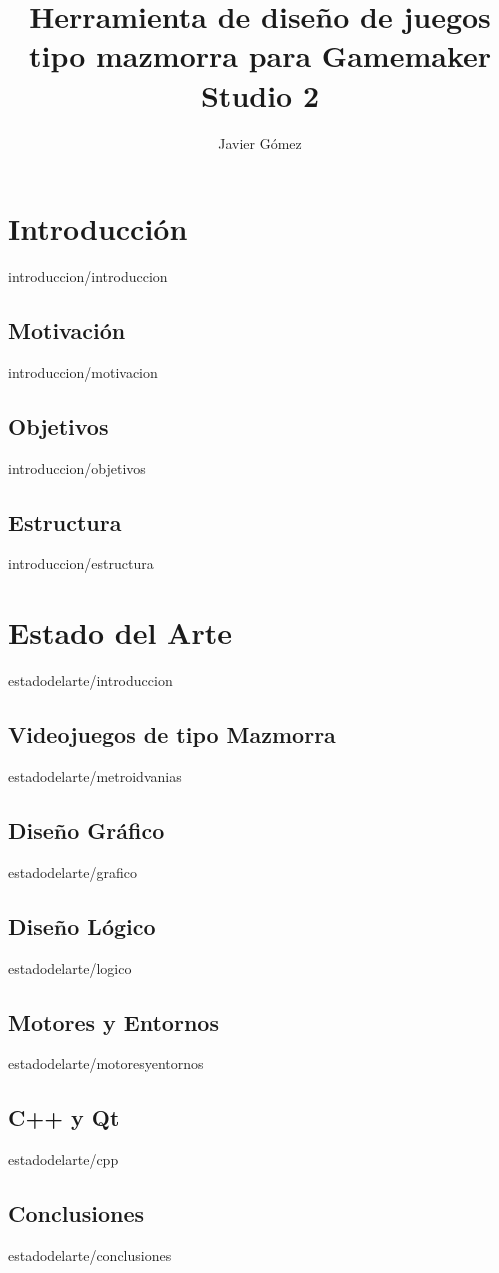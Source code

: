 \documentclass[epsbased,copyright,final,printable,covers,extendedindex,firstnumbered,tfg,gnuplot]{tfgtfmthesisuam}
\title{Herramienta de diseño de juegos tipo mazmorra para Gamemaker Studio 2}
\subtitle{}
\author{Javier Gómez}
\begin{document}
\chapter{Introducción\label{CAP:INTRODUCCION}}{introduccion/introduccion}
	\section{Motivación\label{SEC:MOTIVACION}}{introduccion/motivacion}
	\section{Objetivos\label{SEC:OBJETIVOS}}{introduccion/objetivos}
	\section{Estructura\label{SEC:ESTRUCTURA}}{introduccion/estructura}
	
\chapter{Estado del Arte\label{CAP:ESTADODELARTE}}{estadodelarte/introduccion}
	\section{Videojuegos de tipo Mazmorra\label{SEC:METROIDVANIAS}}{estadodelarte/metroidvanias}
	\section{Diseño Gráfico\label{SEC:DISENOGRAFICO}}{estadodelarte/grafico}
	\section{Diseño Lógico\label{SEC:DISENOLOGICO}}{estadodelarte/logico}
	\section{Motores y Entornos\label{SEC:MOTORESYENTORNOS}}{estadodelarte/motoresyentornos}
	\section{C++ y Qt\label{SEC:C++QT}}{estadodelarte/cpp}
	\section{Conclusiones\label{SEC:ESTADODELARTECONCLUSIONES}}{estadodelarte/conclusiones}
	
\end{document}
